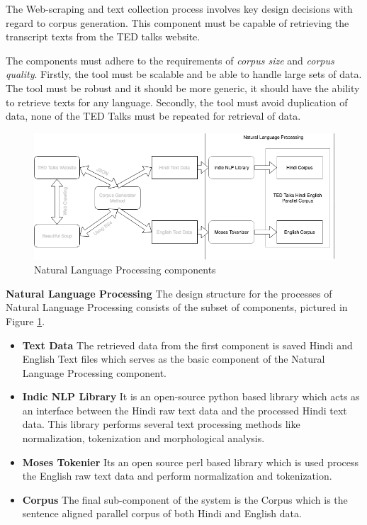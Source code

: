 The Web-scraping and text collection process involves key design decisions with regard to corpus generation. This component must be capable of retrieving the transcript texts from the TED talks website. 

The components must adhere to the requirements of \textit{ corpus size} and \textit{corpus quality}. Firstly, the tool must be scalable and be able to handle large sets of data. The tool must be robust and it should be more generic, it should have the ability to retrieve texts for any language. Secondly, the tool must avoid duplication of data, none of the TED Talks must be repeated for retrieval of data.

\begin{figure}[h]
\includegraphics[width=\textwidth]{figures/design3.png}
\caption{Natural Language Processing components} \label{design3}
\end{figure}

\textbf{Natural Language Processing } The design structure for the processes of Natural Language Processing consists of the subset of components, pictured in Figure \ref{design3}.

\begin{itemize}
    \item \textbf{Text Data} The retrieved data from the first component is saved Hindi and English Text files which serves as the basic component of the Natural Language Processing component.
    \item \textbf{Indic NLP Library } It is an open-source python based library which acts as an interface between the Hindi raw text data and the processed Hindi text data. This library performs several text processing methods like normalization, tokenization and morphological analysis.
    \item\textbf{Moses Tokenier} Its an open source perl based library which is used process the English raw text data and perform normalization and tokenization.
    \item\textbf{Corpus} The final sub-component of the system is the Corpus which is the sentence aligned parallel corpus of both Hindi and English data.
\end{itemize}


